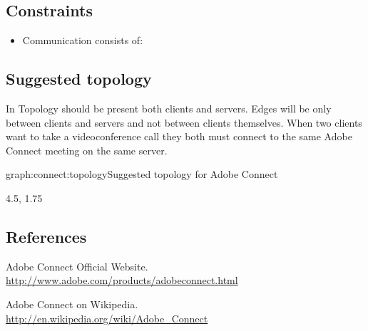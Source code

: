 \subsection{Constraints}

\begin{itemize}
\item Communication consists of:
\end{itemize}

\subsection{Suggested topology}

In Topology should be present both clients and servers. Edges will be only 
between clients and servers and not between clients themselves. When two 
clients want to take a videoconference call they both must connect to the same 
Adobe Connect meeting on the same server.

\begin{Graph}{graph:connect:topology}{Suggested topology for Adobe Connect}  

      
  
  \begin{GraphLegend}{4.5, 1.75}
  \end{GraphLegend}
\end{Graph}

\subsection{References}

\renewcommand{\bibsection}{}
\begin{thebibliography}{1}

Adobe Connect Official Website.
\\ \url{http://www.adobe.com/products/adobeconnect.html}

Adobe Connect on Wikipedia.
\\ \url{http://en.wikipedia.org/wiki/Adobe_Connect}

\end{thebibliography}
